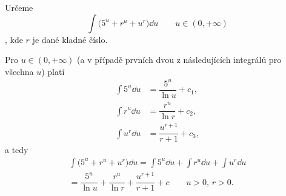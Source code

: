 \begin{mdframed}[style=mdexam]
  \begin{example}\label{MAI:exam145}
    Určeme \[\int\bigl(5^u + r^u + u^r\bigr)\dd{u}\qquad u\in(0, +\infty)\], kde \(r\) je dané
    kladné číslo. 
    
    Pro \(u\in(0, +\infty)\) (a v případě prvních dvou z následujících integrálů pro všechna \(u\))
    platí
    \begin{align*}
      \int 5^u\dd{u}  &= \dfrac{5^u}{\ln u}   + c_1,  \\
      \int r^u\dd{u}  &= \dfrac{r^u}{\ln r}   + c_2,  \\
      \int u^r\dd{u}  &= \dfrac{u^{r+1}}{r+1} + c_3,
    \end{align*}  
    a tedy
    \begin{multline*}
      \int\bigl(5^u + r^u + u^r\bigr)\dd{u} = \int 5^u\dd{u}+\int r^u\dd{u}+\int u^r\dd{u}        \\
          =\dfrac{5^u}{\ln u} + \dfrac{r^u}{\ln r} + \dfrac{u^{r+1}}{r+1} + c\qquad u>0, \, r>0. 
    \end{multline*}
  \end{example}
\end{mdframed}